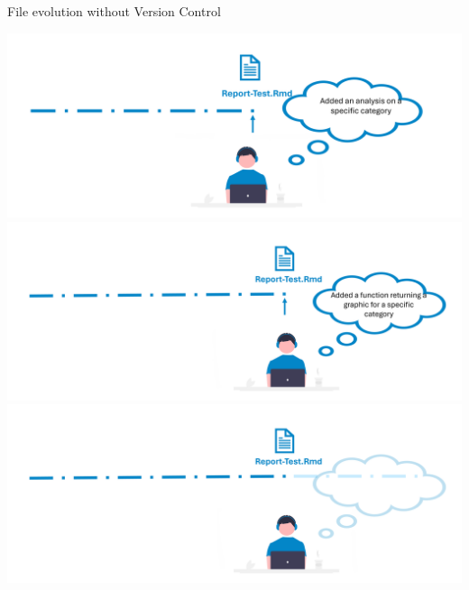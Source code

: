 \documentclass[xcolor=x11names,compress, aspectratio=169]{beamer}
\renewcommand{\(}{\begin{columns}}
\renewcommand{\)}{\end{columns}}
\newcommand{\<}[1]{\begin{column}{#1}}
\renewcommand{\>}{\end{column}}
\begin{document}
\begin{frame}{File evolution  \textcolor{brique}{without Version Control}  }
\begin{center}
\begin{itemize}
    {\includegraphics[width = 1.0\textwidth]{FileChange5a.png} \\ }
    {\includegraphics[width = 1.0\textwidth]{FileChange6a.png} \\ }
    {\includegraphics[width = 1.0\textwidth]{FileChange7a.png} \\ }
\end{itemize}
\end{center}
\end{frame}
\end{document}
